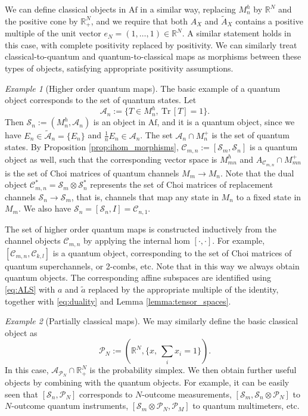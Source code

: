 \documentclass[12pt]{article}
\theoremstyle{definition}
\theoremstyle{remark}
\newtheorem{exm}{Example}
\def\Ce{\mathcal C}
\def\Pe{\mathcal P}
\def \Tr{\mathrm{Tr}\,}
\def\Se {\mathcal S}
\def \Af{\mathrm{Af}}
\begin{document}
We can define classical objects in $\Af$ in a similar way, replacing $M_n^h$ by $\mathbb
R^N$ and the positive cone by $\mathbb R_+^N$, and we require that  both
$A_X$ and $\tilde A_X$ contains a positive multiple of the unit vector $e_N=(1,\dots,1)\in
\mathbb R^N$. A similar statement holds in this case,
with complete positivity replaced by positivity. We can similarly treat
classical-to-quantum and quantum-to-classical maps as morphisms between these types of
objects, satisfying appropriate positivity assumptions.

\begin{exm}[Higher order quantum maps] \label{exm:quantum_maps} The basic example of a quantum object
corresponds to the set of quantum states. Let  
\[
\mathcal A_n:=\{T\in M_n^h, \ \Tr[T]=1\}.
\]
Then $\Se_n:=(M_n^h,\mathcal A_n)$ is an object in $\Af$, and it is a quantum object, since we have 
 $E_n\in \tilde {\mathcal A}_n=\{E_n\}$ and $\frac 1n E_n\in
\mathcal A_n$. 
The set $\mathcal A_n\cap M_n^+$ is the set of quantum states. By Proposition
\ref{prop:ihom_morphisms}, $\Ce_{m,n}:=[\Se_m,\Se_n]$ is a quantum object as well, such
that the corresponding vector space is $M_{mn}^h$ and $A_{\Ce_{m,n}}\cap M_{mn}^+$ is the set
of Choi matrices of quantum channels $M_m\to M_n$. Note that the dual object
$\Ce^*_{m,n}=\Se_m\otimes \Se_n^*$ represents the set of Choi matrices of replacement
channels $\Se_n\to \Se_m$, that is, channels that map any state in $M_n$ to a fixed state
in $M_m$. We also have $\Se_n=[\Se_n,I]=\Ce_{n,1}$.

The set of higher order quantum maps is constructed inductively from the channel objects $\Ce_{m,n}$ 
by applying the internal hom $[\cdot,\cdot]$. For example,  $[\Ce_{m,n},\Ce_{k,l}]$ is a
 quantum object, corresponding to the set of Choi matrices of quantum
superchannels, or 2-combs, etc. Note that in this way we always obtain quantum
objects. The corresponding affine subspaces are identified using 
\eqref{eq:ALS} with $a$ and $\tilde a$ replaced by the appropriate multiple of the
identity, together with \eqref{eq:duality} and Lemma \ref{lemma:tensor_spaces}.


\end{exm}


\begin{exm}[Partially classical maps]\label{exm:quantum_classical}  We may similarly define the basic
classical object as 
\[
\Pe_N:=(\mathbb R^N, \{x,\ \sum_i x_i=1\}).
\]
In this case, $\mathcal A_{\Pe_N}\cap \mathbb R^N_+$ is the probability simplex. We then
obtain further  useful objects by combining with the quantum objects. For example, it can be
easily seen that $[\Se_n,\Pe_N]$ corresponds to $N$-outcome measurements,
$[\Se_m,\Se_n\otimes \Pe_N]$ to $N$-outcome quantum instruments, $[\Se_m\otimes
\Pe_N,\Pe_M]$ to quantum multimeters, etc. 

\end{exm}
\end{document}
